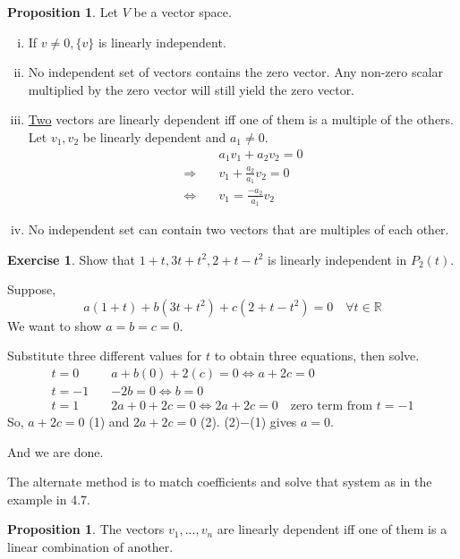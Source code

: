 \documentclass{report}
\theoremstyle{definition}
\newtheorem{_exc}{Exercise}[section]
\newtheorem{_prop}[_thm]{Proposition}
\theoremstyle{remark}
\begin{document}
\begin{_prop}
Let $V$ be a vector space.
\begin{enumerate}[i)]
 \item If $v\neq 0, \{v\}$ is linearly independent.
 \item No independent set of vectors contains the zero vector.
 Any non-zero scalar multiplied by the zero vector will still yield the zero vector.
 \item \underline{Two} vectors are linearly dependent iff one of them is a multiple of the others.
 Let $v_1, v_2$ be linearly dependent and $a_1\neq 0$.
 \begin{align*}
 &a_1v_1+a_2v_2=0 \\
 \Rightarrow \quad & v_1+\frac{a_2}{a_1}v_2=0 \\
 \Leftrightarrow \quad & v_1=\frac{-a_2}{a_1}v_2
 \end{align*}
 \item No independent set can contain two vectors that are multiples of each other.
\end{enumerate}
\end{_prop}

\begin{_exc}
Show that ${1+t,3t+t^2,2+t-t^2}$ is linearly independent in $P_2(t)$.

Suppose,
\[a(1+t)+b(3t+t^2)+c(2+t-t^2)=0\quad \forall t\in \mathbb{R}\]
We want to show $a=b=c=0$.

Substitute three different values for $t$ to obtain three equations, then solve.
\begin{align*}
t=0\quad & a+b(0)+2(c)=0\Leftrightarrow a+2c=0\\
t=-1\quad & -2b=0\Leftrightarrow b=0\\
t=1\quad & 2a+0+2c=0\Leftrightarrow 2a+2c=0\quad \text{zero term from }t=-1
\end{align*}
So, $a+2c=0$ (1) and $2a+2c=0$ (2).
(2)$-$(1) gives $a=0$.

And we are done.

The alternate method is to match coefficients and solve that system as in the example in 4.7.
\end{_exc}

\begin{_prop}
The vectors $v_1,...,v_n$ are linearly dependent iff one of them is a linear combination of another.
\end{_prop}
\end{document}
